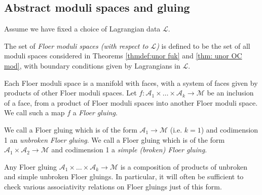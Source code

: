 \documentclass{TPmod}
\newcommand{\cA}{\mathcal{A}}
\newcommand{\cL}{\mathcal{L}}
\newcommand{\cM}{\mathcal{M}}
\numberwithin{equation}{section}
\begin{document}
\subsection{Abstract moduli spaces and gluing}
    \begin{defn}\label{def: Floer mod spac}
        Assume we have fixed a choice of Lagrangian data $\cL$. 

        The set of \emph{Floer moduli spaces (with respect to $\cL$)} is defined to be the set of all moduli spaces considered in Theorems \ref{thmdef:unor fuk} and \ref{thm: unor OC mod}, with boundary conditions given by Lagrangians in $\cL$.

        Each Floer moduli space is a manifold with faces, with a system of faces given by products of other Floer moduli spaces. Let $f: \cA_1 \times \ldots \times \cA_k \to \cM$ be an inclusion of a face, from a product of Floer moduli spaces into another Floer moduli space. We call such a map $f$ a \emph{Floer gluing}.

        We call a Floer gluing which is of the form $\cA_1 \to \cM$ (i.e. $k=1$) and codimension 1 an \emph{unbroken Floer gluing}. We call a Floer gluing which is of the form $\cA_1 \times \cA_2 \to \cM$ and codimension 1 a \emph{simple (broken) Floer gluing}.
    \end{defn}
    \begin{rmk}\label{rem: Floer glue bloc}
        Any Floer gluing $\cA_1 \times \ldots \times \cA_k \to \cM$ is a composition of products of unbroken and simple unbroken Floer gluings. In particular, it will often be sufficient to check various associativity relations on Floer gluings just of this form.
    \end{rmk}
\end{document}
